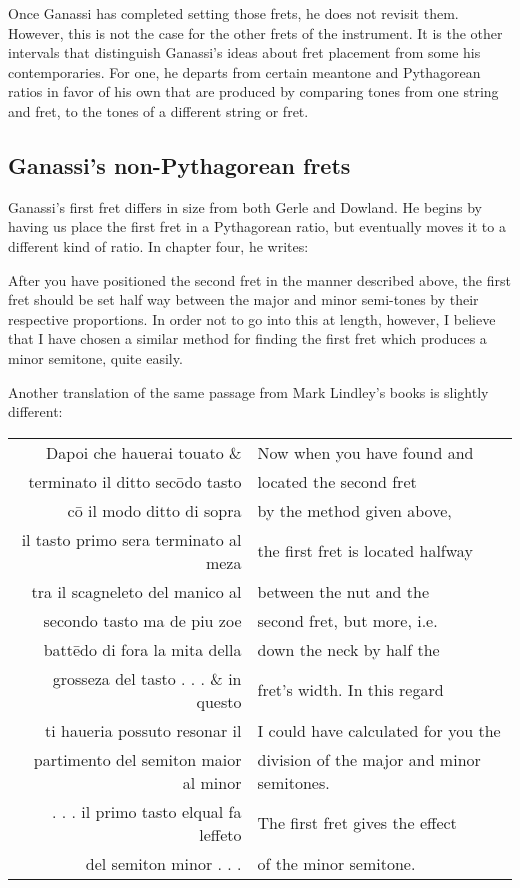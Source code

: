 Once Ganassi has completed setting those frets, he does not revisit them.  However,
this is not the case for the other frets of the instrument.  It is the other intervals
that distinguish Ganassi's ideas about fret placement from some his contemporaries.
For one, he departs from certain meantone and Pythagorean ratios in favor of his own
that are produced by comparing tones from one string and fret, to the tones of a
different string or fret.

\subsection{Ganassi's non-Pythagorean frets}

Ganassi's first fret differs in size from both Gerle and Dowland.  He begins by having
us place the first fret in a Pythagorean ratio, but eventually moves it to a different
kind of ratio.  In chapter four, he writes:
\begin{blocks}
After you have positioned the second fret in the manner described above, the
first fret should be set half way between the major and minor semi-tones by
their respective proportions.  In order not to go into this at length, however,
I believe that I have chosen a similar method for finding the first fret which
produces a minor semitone, quite easily.\autocite[106]{RB:2}
\end{blocks}
Another translation of the same passage from Mark Lindley's books is slightly different:
\begin{blocks}
\begin{center}
\begin{tabular}{r l}
Dapoi che hauerai touato \&            & Now when you have found and \\
terminato il ditto sec\={o}do tasto    & located the second fret \\
c\={o} il modo ditto di sopra          & by the method given above, \\
il tasto primo sera terminato al meza  & the first fret is located halfway  \\
tra il scagneleto del manico al        & between the nut and the  \\
secondo tasto ma de piu zoe            & second fret, but more, i.e.  \\
batt\={e}do di fora la mita della      & down the neck by half the \\
grosseza del tasto . . . \& in questo  & fret's width.  In this regard \\
ti haueria possuto resonar il          & I could have calculated for you the \\
partimento del semiton maior al minor  & division of the major and minor semitones. \\
. . . il primo tasto elqual fa leffeto & The first fret gives the effect \\
del semiton minor . . .                & of the minor semitone. \\
\end{tabular}
\end{center}
\end{blocks}

